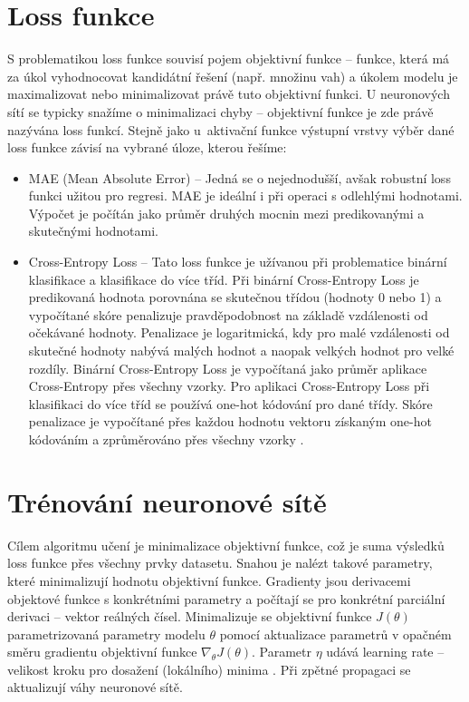 \section{Loss funkce}
S problematikou loss funkce souvisí pojem objektivní funkce -- funkce, která má za úkol vyhodnocovat kandidátní řešení (např. množinu vah) a úkolem modelu je maximalizovat nebo minimalizovat právě tuto objektivní funkci. U neuronových sítí se typicky snažíme o minimalizaci chyby -- objektivní funkce je zde právě nazývána loss funkcí. Stejně jako u~aktivační funkce výstupní vrstvy výběr dané loss funkce závisí na vybrané úloze, kterou řešíme:
\begin{itemize}
    \item MAE (Mean Absolute Error) -- Jedná se o nejednodušší, avšak robustní loss funkci užitou pro regresi. MAE je ideální i při operaci s odlehlými hodnotami. Výpočet je počítán jako průměr druhých mocnin mezi predikovanými a skutečnými hodnotami.
    \item Cross-Entropy Loss -- Tato loss funkce je užívanou při problematice binární klasifikace a klasifikace do více tříd. Při binární Cross-Entropy Loss je predikovaná hodnota porovnána se skutečnou třídou (hodnoty 0 nebo 1) a vypočítané skóre penalizuje pravděpodobnost na základě vzdálenosti od očekávané hodnoty. Penalizace je logaritmická, kdy pro malé vzdálenosti od skutečné hodnoty nabývá malých hodnot a naopak velkých hodnot pro velké rozdíly. Binární Cross-Entropy Loss je vypočítaná jako průměr aplikace Cross-Entropy přes všechny vzorky. Pro aplikaci Cross-Entropy Loss při klasifikaci do více tříd se používá one-hot kódování pro dané třídy. Skóre penalizace je vypočítané přes každou hodnotu vektoru získaným one-hot kódováním a zprůměrováno přes všechny vzorky \cite{LossFunctions}.
\end{itemize}
\section{Trénování neuronové sítě}
Cílem algoritmu učení je minimalizace objektivní funkce, což je suma výsledků loss funkce přes všechny prvky datasetu. Snahou je nalézt takové parametry, které minimalizují hodnotu objektivní funkce. Gradienty jsou derivacemi objektové funkce s konkrétními parametry a počítají se pro konkrétní parciální derivaci -- vektor reálných čísel. Minimalizuje se objektivní funkce $J(\theta)$ parametrizovaná parametry modelu $\theta$ pomocí aktualizace parametrů v opačném směru gradientu objektivní funkce $\nabla_{\theta}J(\theta)$. Parametr $\eta$ udává learning rate -- velikost kroku pro dosažení (lokálního) minima \cite{GradientDescent}. Při zpětné propagaci se aktualizují váhy neuronové sítě.

